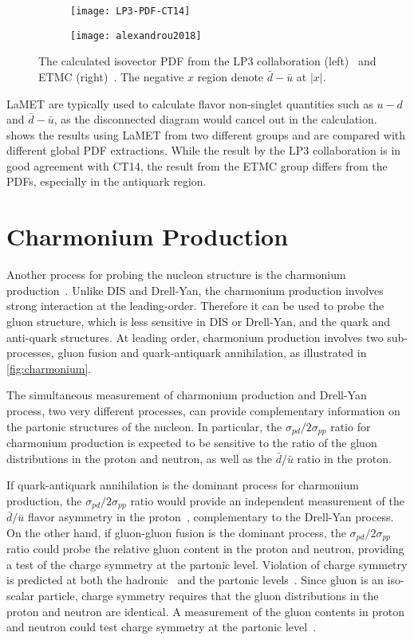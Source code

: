 \documentclass[../main.tex]{subfiles}
\begin{document}
\begin{figure}[h!]
	\centering
	\begin{subfigure}{0.45\linewidth}
		\texttt{[image: LP3-PDF-CT14]}
	\end{subfigure}
	\begin{subfigure}{0.45\linewidth}
		\texttt{[image: alexandrou2018]}
	\end{subfigure}
	\caption{The calculated isovector PDF from the LP3 collaboration (left)~\cite{chen2018}
		and ETMC (right)~\cite{alexandrou2018}.
		The negative $x$ region denote $\bar{d}-\bar{u}$ at $\left|x\right|$.}
	\label{fig:lamet}
\end{figure}
LaMET are typically used to calculate flavor non-singlet quantities such as $u-d$ and $\bar{d}-\bar{u}$,
as the disconnected diagram would cancel out in the calculation.
 shows the results using LaMET from two different groups and are compared with
different global PDF extractions. While the result by the LP3 collaboration
is in good agreement with CT14, the result from the ETMC group differs from the PDFs,
especially in the antiquark region.

\chapter{Charmonium Production}
\label{ch:jpsi}
Another process for probing the nucleon structure is the charmonium production~\cite{peng1995,chang2020}.
Unlike DIS and Drell-Yan, the charmonium production involves strong interaction
at the leading-order. Therefore it can be used to probe the gluon structure, which is
less sensitive in DIS or Drell-Yan, and the quark and anti-quark structures.
At leading order, charmonium production involves two sub-processes, gluon fusion and
quark-antiquark annihilation, as illustrated in \cref{fig:charmonium}.

The simultaneous measurement of charmonium production and Drell-Yan process, two very different
processes, can provide complementary information on the partonic structures of the nucleon.
In particular, the $\sigma_{pd}/2\sigma_{pp}$ ratio for charmonium
production is expected to be sensitive to the ratio of the gluon distributions in the proton
and neutron, as well as the $\bar{d}/\bar{u}$ ratio in the proton.

If quark-antiquark annihilation is the dominant process for charmonium
production, the $\sigma_{pd}/2\sigma_{pp}$ ratio would provide an
independent measurement of the $\bar{d}/ \bar{u}$ flavor asymmetry in the
proton~\cite{peng1995}, complementary to the Drell-Yan process.
On the other hand, if gluon-gluon fusion is the dominant process, the
$\sigma_{pd}/2\sigma_{pp}$ ratio could probe the relative gluon content
in the proton and neutron, providing a test of the charge symmetry at the partonic level.
Violation of charge symmetry is predicted at both the hadronic~\cite{stephenson2003,opper2003}
and the partonic levels~\cite{londergan2010}. Since gluon is an iso-scalar particle,
charge symmetry requires that the gluon distributions in the proton and neutron
are identical. A measurement of the gluon contents in proton and neutron could test charge symmetry at
the partonic level~\cite{piller1996,zhu2008,lansberg2012}.
\end{document}

